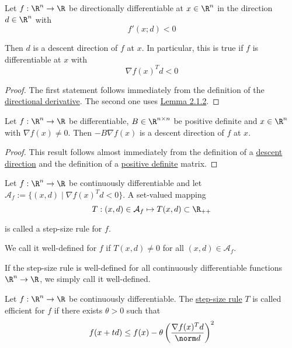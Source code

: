\label{f81d53c}

Let $f:\R^n\to\R$ be directionally differentiable at $x\in\R^n$ in the
direction $d\in\R^n$ with
$$
	f'(x;d)<0
$$

Then $d$ is a descent direction of $f$ at $x$. In particular, this is
true if $f$ is differentiable at $x$ with
$$
	\nabla f(x)^Td<0
$$

\begin{proof}
	The first statement follows immediately from the definition of the
	\href{37eb747}{directional derivative}. The second one uses
	\href{ed67d29}{Lemma 2.1.2}.
\end{proof}

\label{c41d0f0}

Let $f:\R^n\to\R$ be differentiable, $B\in\R^{n\times n}$ be positive
definite and $x\in\R^n$ with $\nabla f(x)\neq0$. Then $-B\nabla f(x)$
is a descent direction of $f$ at $x$.

\begin{proof}
	This result follows almost immediately from the definition of a
	\href{37eb747}{descent direction} and the definition of a
	\href{e25e722}{positive definite} matrix.
\end{proof}

\label{ae4eac6}

Let $f:{\R}^n\to{\R}$ be continuously differentiable and
let $\mathcal A_f:=\{(x,d)\mid\nabla f(x)^Td<0\}$. A set-valued
mapping
$$
	T:(x,d)\in\mathcal A_f\mapsto T(x,d)\subset\R_{++}
$$

is called a step-size rule for $f$.

We call it well-defined for $f$ if $T(x,d)\neq0$ for all
$(x,d)\in\mathcal{A}_f$.

If the step-size rule is well-defined for all continuously
differentiable functions ${\R}^n\to{\R}$, we simply call it
well-defined.

\label{d23fdf0}

Let $f:\R^n\to\R$ be continuously differentiable. The
\href{ae4eac6}{step-size rule} $T$ is called efficient for $f$ if
there exists $\theta>0$ such that
$$
	f(x+td)\leq f(x)-\theta\left(\frac{\nabla f(x)^Td}{\norm d}\right)^2
$$

\label{aa19bbb}

